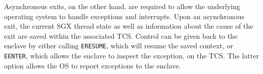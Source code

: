 Asynchronous exits, on the other hand, are required to allow the underlying operating system to handle exceptions and interrupts.
Upon an asynchronous exit, the current SGX thread state as well as information about the cause of the exit are saved within the associated TCS.
Control can be given back to the enclave by either calling \lstinline{ERESUME}, which will resume the saved context, or \lstinline{EENTER}, which allows the enclave to inspect the exception, on the TCS.
The latter option allows the OS to report exceptions to the enclave.
%
%
%
%
%


